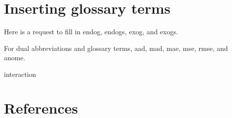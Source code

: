 \documentclass[10pt, letterpaper, twoside]{article}
\begin{document}
\section{Inserting glossary terms}\label{sec:glossary_terms}

Here is a request to fill in \gls{endog}, \glspl{endog}, \gls{exog}, and \glspl{exog}.

For dual abbreviations and glossary terms, \gls{aad}, \gls{mad}, \gls{mae}, \gls{mse}, \gls{rmse}, and \gls{anome}.

\gls{interaction}



\newpage
\printunsrtglossary[type={abbreviations}]

\newpage
\printunsrtglossary[style={indexgroup}]

\newpage
\section{References}\label{sec:references}
\nocite{*}
\printbibliography[heading=none]
\end{document}
